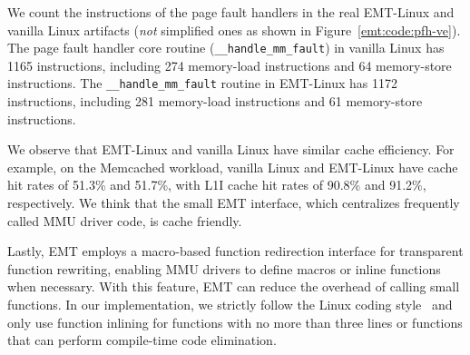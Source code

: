We count the instructions of the page fault handlers
	in the real EMT-Linux and vanilla Linux artifacts ({\it not} simplified ones as shown in Figure~\ref{emt:code:pfh-ve}).
The page fault handler core routine (\texttt{\small \_\_handle\_mm\_fault}) in vanilla Linux
	has 1165 instructions, including 274 memory-load instructions and 64 memory-store instructions.
The \texttt{\small \_\_handle\_mm\_fault} routine in EMT-Linux has 1172 instructions, including 281 memory-load instructions 
  and 61 memory-store instructions.

We observe that EMT-Linux and vanilla Linux have similar cache efficiency.
For example, on the Memcached workload, 
  vanilla Linux and EMT-Linux have cache hit rates of 51.3\% and 51.7\%,
  with L1I cache hit rates of 90.8\% and 91.2\%, respectively.
We think that the small EMT interface, which centralizes frequently called 
  MMU driver code,
  is cache friendly.

Lastly, EMT employs a macro-based function redirection interface for
  transparent function rewriting, enabling MMU drivers to define macros or inline functions when necessary.
With this feature, EMT can reduce the overhead of calling small functions.
In our implementation,
	we strictly follow the Linux coding style~\cite{linux:code:icache} and only use function inlining
	for functions with no more than three lines
	or functions that can perform compile-time code elimination.

